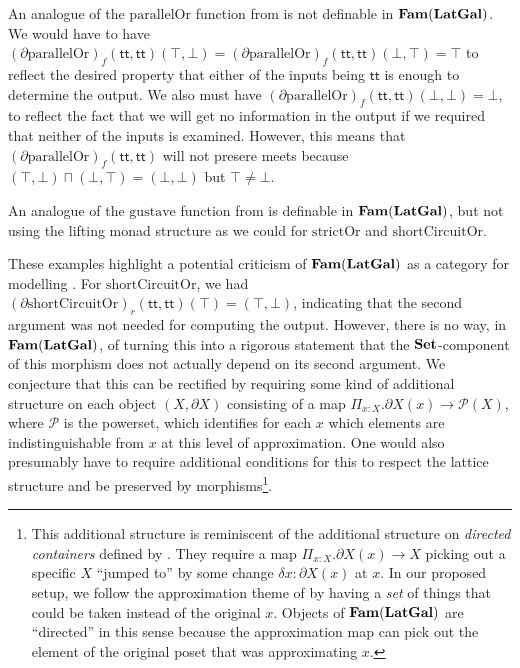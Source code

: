 An analogue of the $\mathrm{parallelOr}$ function from
 is not definable in $\mathbf{Fam}(\mathbf{LatGal})$. We would have
to have
$(\partial \mathrm{parallelOr})_f(\mathsf{tt},\mathsf{tt})(\top,\bot)
= (\partial \mathrm{parallelOr})_f(\mathsf{tt},\mathsf{tt})(\bot,\top)
= \top$ to reflect the desired property that either of the inputs
being $\mathsf{tt}$ is enough to determine the output. We also must
have
$(\partial \mathrm{parallelOr})_f(\mathsf{tt},\mathsf{tt})(\bot,\bot)
= \bot$, to reflect the fact that we will get no information in the
output if we required that neither of the inputs is examined. However,
this means that
$(\partial \mathrm{parallelOr})_f(\mathsf{tt},\mathsf{tt})$ will not
presere meets because $(\top,\bot) \sqcap (\bot,\top) = (\bot,\bot)$
but $\top \neq \bot$.

An analogue of the $\mathrm{gustave}$ function from
 is definable in $\mathbf{Fam}(\mathbf{LatGal})$, but not using the
lifting monad structure as we could for $\mathrm{strictOr}$ and
$\mathrm{shortCircuitOr}$.

\begin{remark}
  \label{rem:further-structure}
  These examples highlight a potential criticism of $\mathbf{Fam}(\mathbf{LatGal})$ as
  a category for modelling \GPS. For $\mathrm{shortCircuitOr}$, we had
  $(\partial \mathrm{shortCircuitOr})_r(\mathsf{tt},\mathsf{tt})(\top)
  = (\top, \bot)$, indicating that the second argument was not needed
  for computing the output. However, there is no way, in
  $\mathbf{Fam}(\mathbf{LatGal})$, of turning this into a rigorous statement that the
  $\mathbf{Set}$-component of this morphism does not actually depend on its
  second argument. We conjecture that this can be rectified by
  requiring some kind of additional structure on each object
  $(X, \partial X)$ consisting of a map
  $\Pi_{x : X}.\partial X(x) \to \mathcal{P}(X)$, where $\mathcal{P}$
  is the powerset, which identifies for each $x$ which elements are
  indistinguishable from $x$ at this level of approximation. One would
  also presumably have to require additional conditions for this to
  respect the lattice structure and be preserved by
  morphisms\footnote{This additional structure is reminiscent of the
    additional structure on \emph{directed containers} defined by
    \citet{ahman-uustalu}. They require a map
    $\Pi_{x : X}.\partial X(x) \to X$ picking out a specific $X$
    ``jumped to'' by some change $\delta x : \partial X(x)$ at $x$. In
    our proposed setup, we follow the approximation theme of \GPS by
    having a \emph{set} of things that could be taken instead of the
    original $x$. Objects of $\mathbf{Fam}(\mathbf{LatGal})$ are ``directed'' in this
    sense because the approximation map can pick out the element of
    the original poset that was approximating $x$.}.
\end{remark}

